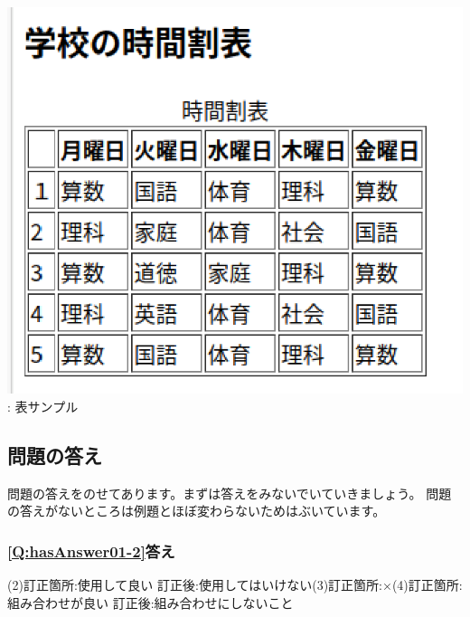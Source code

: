 \documentclass[a4paper,12pt]{jarticle}
\begin{document}
\begin{minipage}{0.4\textwidth}
  {\upshape
    \includegraphics[width=\linewidth]{textbook-img211.png}
    \newline
    {\theFigure\label{seq:refFigure45}}:
    表サンプル}
\end{minipage}

\bigskip

\flushleft
\clearpage\subsection{\bfseries
  問題の答え}

問題の答えをのせてあります。まずは答えをみないでいていきましょう。\newline
問題の答えがないところは例題とほぼ変わらないためはぶいています。

\subsubsection{\bfseries
  \ref*{Q:hasAnswer01-2}答え}

  (2)訂正箇所:使用して良い \hspace{2em} 訂正後:使用してはいけない\newline(3)訂正箇所:×\newline(4)訂正箇所:組み合わせが良い\hspace{2em} 訂正後:組み合わせにしないこと\newline
\end{document}
